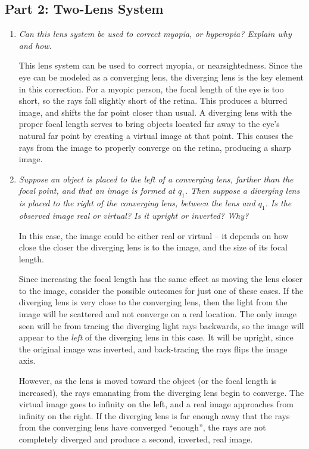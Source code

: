 \documentclass[twocolumn,english]{IEEEtran}
\theoremstyle{plain}
\theoremstyle{plain}
\begin{document}
\subsection{Part 2: Two-Lens System}
\begin{enumerate}
	\item \textit{Can this lens system be used to correct myopia, or hyperopia? Explain why and how.}

	This lens system can be used to correct myopia, or nearsightedness. Since the eye can be modeled as a converging lens, the diverging lens is the key element in this correction. For a myopic person, the focal length of the eye is too short, so the rays fall slightly short of the retina. This produces a blurred image, and shifts the far point closer than usual. A diverging lens with the proper focal length serves to bring objects located far away to the eye's natural far point by creating a virtual image at that point. This causes the rays from the image to properly converge on the retina, producing a sharp image.

	\item \textit{Suppose an object is placed to the left of a converging lens, farther than the focal point, and that an image is formed at $q_1$. Then suppose a diverging lens is placed to the right of the converging lens, between the lens and $q_1$. Is the observed image real or virtual? Is it upright or inverted? Why?}

	In this case, the image could be either real or virtual -- it depends on how close the closer the diverging lens is to the image, and the size of its focal length.

	Since increasing the focal length has the same effect as moving the lens closer to the image, consider the possible outcomes for just one of these cases. If the diverging lens is very close to the converging lens, then the light from the image will be scattered and not converge on a real location. The only image seen will be from tracing the diverging light rays backwards, so the image will appear to the \textit{left} of the diverging lens in this case. It will be upright, since the original image was inverted, and back-tracing the rays flips the image axis.

	However, as the lens is moved toward the object (or the focal length is increased), the rays emanating from the diverging lens begin to converge. The virtual image goes to infinity on the left, and a real image approaches from infinity on the right. If the diverging lens is far enough away that the rays from the converging lens have converged ``enough'', the rays are not completely diverged and produce a second, inverted, real image.
\end{enumerate}
\end{document}
